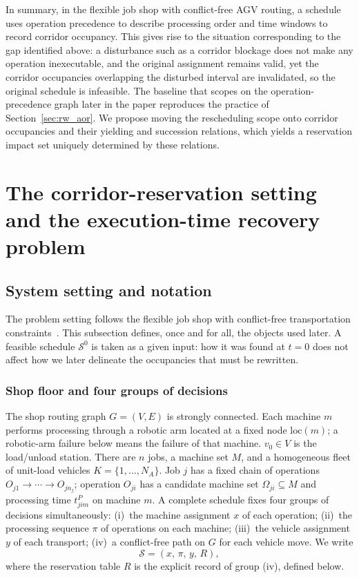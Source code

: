 In summary, in the flexible job shop with conflict-free AGV routing, a schedule uses operation precedence to describe processing order
and time windows to record corridor occupancy. This gives rise to the situation corresponding to the gap identified above:
a disturbance such as a corridor blockage does not make any operation inexecutable, and the original assignment remains valid,
yet the corridor occupancies overlapping the disturbed interval are invalidated, so the original schedule is infeasible.
The baseline that scopes on the operation-precedence graph later in the paper reproduces the practice of Section~\ref{sec:rw_aor}.
We propose moving the rescheduling scope onto corridor occupancies and their yielding and succession relations, which yields a reservation impact set uniquely determined by these relations.

\section{The corridor-reservation setting and the execution-time recovery problem}
\label{sec:problem}

\subsection{System setting and notation}
\label{sec:system_brief}

The problem setting follows the flexible job shop with conflict-free transportation constraints~\cite{vanos2026exact}.
This subsection defines, once and for all, the objects used later. A feasible schedule \(\mathcal{S}^0\) is taken as a given input:
how it was found at \(t=0\) does not affect how we later delineate the occupancies that must be rewritten.

\subsubsection{Shop floor and four groups of decisions}
\label{sec:shop}

The shop routing graph \(G=(V,E)\) is strongly connected. Each machine \(m\) performs processing through a robotic arm located at a fixed node \(\mathrm{loc}(m)\);
a robotic-arm failure below means the failure of that machine.
\(v_0\in V\) is the load/unload station. There are \(n\) jobs, a machine set \(M\), and a homogeneous fleet of unit-load vehicles
\(K=\{1,\ldots,N_A\}\). Job \(j\) has a fixed chain of operations \(O_{j1}\to\cdots\to O_{jn_j}\);
operation \(O_{ji}\) has a candidate machine set \(\Omega_{ji}\subseteq M\) and processing time
\(t^P_{jim}\) on machine \(m\). A complete schedule fixes four groups of decisions simultaneously:
(i)~the machine assignment \(x\) of each operation;
(ii)~the processing sequence \(\pi\) of operations on each machine;
(iii)~the vehicle assignment \(y\) of each transport;
(iv)~a conflict-free path on \(G\) for each vehicle move.
We write
\[
\mathcal{S}=(x,\,\pi,\,y,\,R),
\]
where the reservation table \(R\) is the explicit record of group (iv), defined below.

